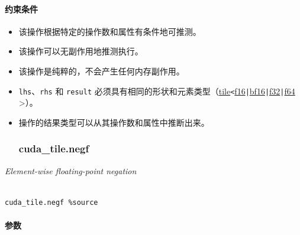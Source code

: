 \documentclass{article}
\begin{document}
\paragraph{约束条件}


\begin{itemize}
\item 该操作根据特定的操作数和属性有条件地可推测。
\item 该操作可以无副作用地推测执行。
\item 该操作是纯粹的，不会产生任何内存副作用。
\item \texttt{lhs}、\texttt{rhs} 和 \texttt{result} 必须具有相同的形状和元素类型（\href{https://docs.nvidia.com/cuda/tile-ir/latest/sections/types.html#type-tile}{tile}\texttt{<}\href{https://docs.nvidia.com/cuda/tile-ir/latest/sections/types.html#subsection-element-types}{f16}\texttt{|}\href{https://docs.nvidia.com/cuda/tile-ir/latest/sections/types.html#subsection-element-types}{bf16}\texttt{|}\href{https://docs.nvidia.com/cuda/tile-ir/latest/sections/types.html#subsection-element-types}{f32}\texttt{|}\href{https://docs.nvidia.com/cuda/tile-ir/latest/sections/types.html#subsection-element-types}{f64} >）。
\item 操作的结果类型可以从其操作数和属性中推断出来。




\subsubsection{cuda\_tile.negf}


\end{itemize}
\textit{Element-wise floating-point negation}




\begin{lstlisting}

cuda_tile.negf %source

\end{lstlisting}



\paragraph{参数}
\end{document}
